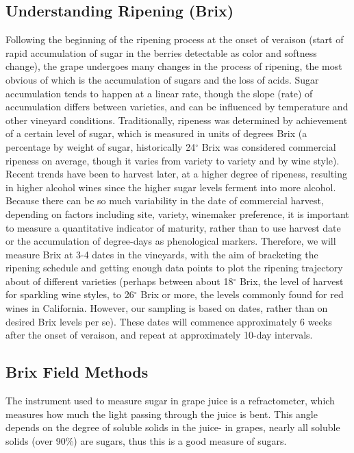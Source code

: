 \documentclass[11pt,letter]{article}
\begin{document}
\subsection{Understanding Ripening (Brix)}

Following the beginning of the ripening process at the onset of veraison (start of rapid accumulation of sugar in the berries detectable as color and softness change), the grape undergoes many changes in the process of ripening, the most obvious of which is the accumulation of sugars and the loss of acids. Sugar accumulation tends to happen at a linear rate, though the slope (rate) of accumulation differs between varieties, and can be influenced by temperature and other vineyard conditions. Traditionally, ripeness was determined by achievement of a certain level of sugar, which is measured in units of degrees Brix (a percentage by weight of sugar, historically 24$^{\circ}$ Brix was considered commercial ripeness on average, though it varies from variety to variety and by wine style). Recent trends have been to harvest later, at a higher degree of ripeness, resulting in higher alcohol wines since the higher sugar levels ferment into more alcohol. \\

Because there can be so much variability in the date of commercial harvest, depending on factors including site, variety, winemaker preference, it is important to measure a quantitative indicator of maturity, rather than to use harvest date or the accumulation of degree-days as phenological markers. Therefore, we will measure Brix at 3-4 dates in the vineyards, with the aim of bracketing the ripening schedule and getting enough data points to plot the ripening trajectory about of different varieties (perhaps between about 18$^{\circ}$ Brix, the level of harvest for sparkling wine styles, to  26$^{\circ}$ Brix or more, the levels commonly found for red wines in California. However, our sampling is based on dates, rather than on desired Brix levels per se). These dates will commence approximately 6 weeks after the onset of veraison, and repeat at approximately 10-day intervals. 

\subsection{Brix Field Methods}

The instrument used to measure sugar in grape juice is a refractometer, which measures how much the light passing through the juice is bent. This angle depends on the degree of soluble solids in the juice- in grapes, nearly all soluble solids (over 90\%) are sugars, thus this is a good measure of sugars. \\
\end{document}
